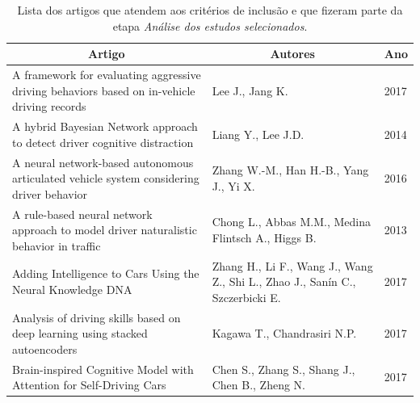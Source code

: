 \documentclass[10pt,journal,compsoc]{IEEEtran}
\begin{document}
\begin{landscape}
\begin{table}[!t]
\renewcommand{\arraystretch}{1.3}
\caption{Lista dos artigos que atendem aos critérios de inclusão e
  que fizeram parte da etapa \emph{Análise dos estudos selecionados}.}
\label{tab:artigosdossie}
\centering
\begin{tabular}{p{12cm}ll}
\multicolumn{1}{c}{\textbf{Artigo}}
  & \multicolumn{1}{c}{\textbf{Autores}}
  & \multicolumn{1}{c}{\textbf{Ano}} \\ \hline
A framework for evaluating aggressive driving behaviors based on in-vehicle driving records                                                      & Lee J., Jang K.                                                              & 2017                             \\
A hybrid Bayesian Network approach to detect driver cognitive distraction                                                                        & Liang Y., Lee J.D.                                                           & 2014                             \\
A neural network-based autonomous articulated vehicle system considering driver behavior                                                         & Zhang W.-M., Han H.-B., Yang J., Yi X.                                       & 2016                             \\
A rule-based neural network approach to model driver naturalistic behavior in traffic                                                            & Chong L., Abbas M.M., Medina Flintsch A., Higgs B.                           & 2013                             \\
Adding Intelligence to Cars Using the Neural Knowledge DNA                                                                                       & Zhang H., Li F., Wang J., Wang Z., Shi L., Zhao J., Sanín C., Szczerbicki E. & 2017                             \\
Analysis of driving skills based on deep learning using stacked autoencoders                                                                     & Kagawa T., Chandrasiri N.P.                                                  & 2017                             \\
Brain-inspired Cognitive Model with Attention for Self-Driving Cars                                                                              & Chen S., Zhang S., Shang J., Chen B., Zheng N.                               & 2017                             \\

\end{tabular}
\end{table}
\end{landscape}
\end{document}
